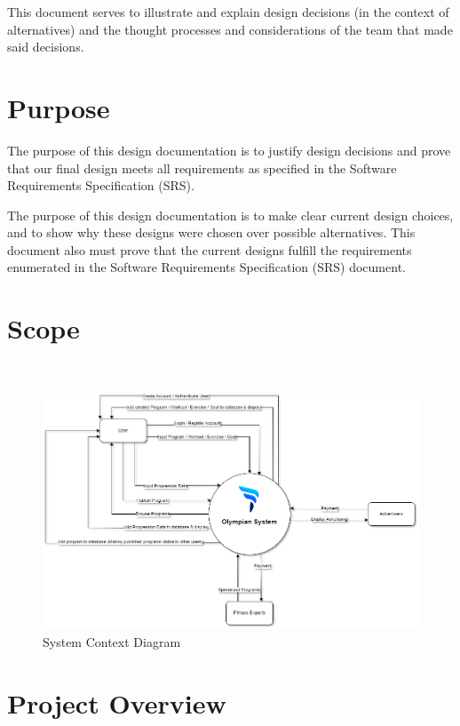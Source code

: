 \documentclass[12pt, titlepage]{article}
\begin{document}
	
	This document serves to illustrate and explain design decisions (in the context of alternatives) and the thought processes and considerations of the team that made said decisions.
	\section{Purpose}
	
	The purpose of this design documentation is to justify design decisions and prove that our final design meets all requirements as specified in the Software Requirements Specification (SRS).
	
	The purpose of this design documentation is to make clear current design choices, and to show why these designs were chosen over possible alternatives. This document also must prove that the current designs fulfill the requirements enumerated in the Software Requirements Specification (SRS) document.
	
	\section{Scope}
	
	\\
	
	\begin{figure}[H]
		\centering
		\includegraphics[scale=0.55]{system_context}
		\caption{System Context Diagram}
	\end{figure}

	\section{Project Overview}
	
\end{document}
